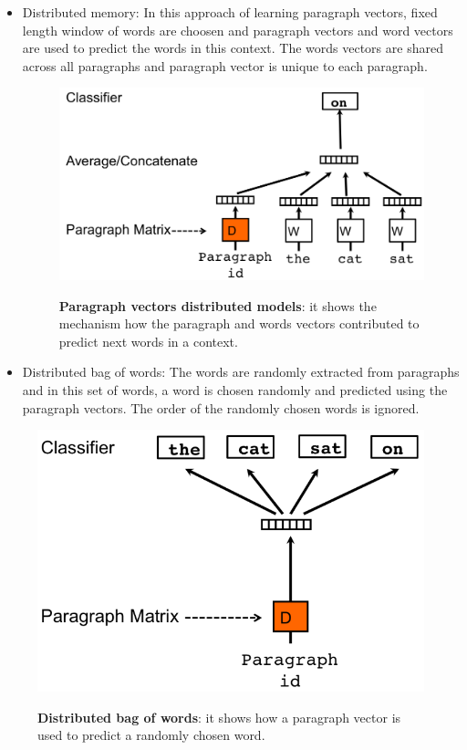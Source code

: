 \begin{itemize}
\item Distributed memory: In this approach of learning paragraph vectors, fixed length window of words are choosen and paragraph vectors and word vectors are used to predict the words in this context. The words vectors are shared across all paragraphs and paragraph vector is unique to each paragraph.

\begin{figure}[h]
\begin{centering}
    {\includegraphics[scale=0.33]{figures/dm.png}}
    \caption[Distributed model]{\textbf{Paragraph vectors distributed models}: it shows the mechanism how the paragraph and words vectors contributed to predict next words in a context.}
\end{centering}
\end{figure}

\item Distributed bag of words: The words are randomly extracted from paragraphs and in this set of words, a word is chosen randomly and predicted using the paragraph vectors. The order of the randomly chosen words is ignored.  
\end{itemize}

\begin{figure}[h]
\begin{centering}
    {\includegraphics[scale=0.33]{figures/dbow.png}}
    \caption[Distributed bag of words]{\textbf{Distributed bag of words}: it shows how a paragraph vector is used to predict a randomly chosen word.}
\end{centering}
\end{figure}

